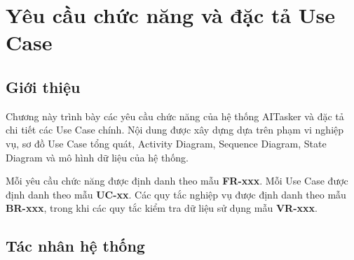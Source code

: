 %
%

\chapter{Yêu cầu chức năng và đặc tả Use Case}
\label{chap:functional-requirements}

\section{Giới thiệu}
\label{sec:chapter4-introduction}

Chương này trình bày các yêu cầu chức năng của hệ thống AITasker và đặc tả chi tiết các Use Case chính. Nội dung được xây dựng dựa trên phạm vi nghiệp vụ, sơ đồ Use Case tổng quát, Activity Diagram, Sequence Diagram, State Diagram và mô hình dữ liệu của hệ thống.

Mỗi yêu cầu chức năng được định danh theo mẫu \textbf{FR-xxx}. Mỗi Use Case được định danh theo mẫu \textbf{UC-xx}. Các quy tắc nghiệp vụ được định danh theo mẫu \textbf{BR-xxx}, trong khi các quy tắc kiểm tra dữ liệu sử dụng mẫu \textbf{VR-xxx}.

\section{Tác nhân hệ thống}
\label{sec:actors}

